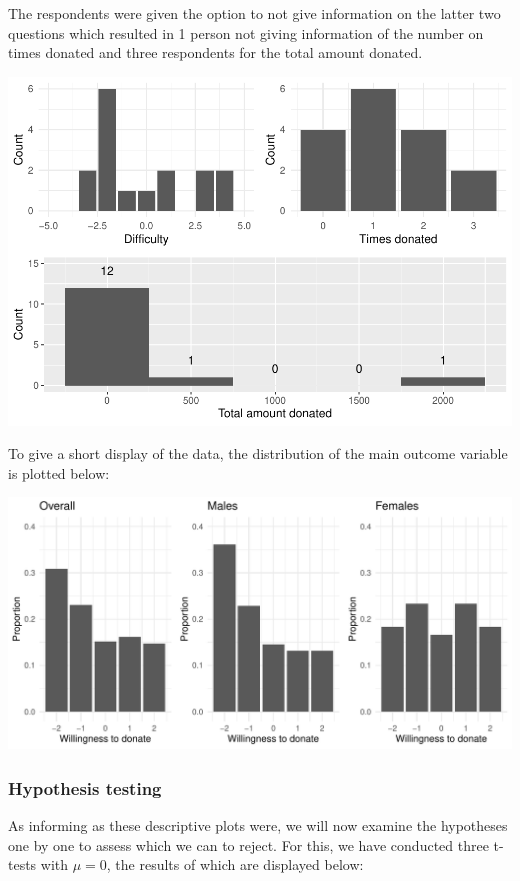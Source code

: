 \documentclass[
  12pt,
]{article}
\begin{document}
The respondents were given the option to not give information on the
latter two questions which resulted in 1 person not giving information
of the number on times donated and three respondents for the total
amount donated.

\includegraphics{FSE_paper_files/figure-latex/plotting_b_questions-1.pdf}

To give a short display of the data, the distribution of the main
outcome variable is plotted below:

\includegraphics{FSE_paper_files/figure-latex/plotting_proportions-1.pdf}

\hypertarget{hypothesis-testing}{%
\subsubsection{Hypothesis testing}\label{hypothesis-testing}}

As informing as these descriptive plots were, we will now examine the
hypotheses one by one to assess which we can to reject. For this, we
have conducted three t-tests with \(\mu = 0\), the results of which are
displayed below:
\end{document}
